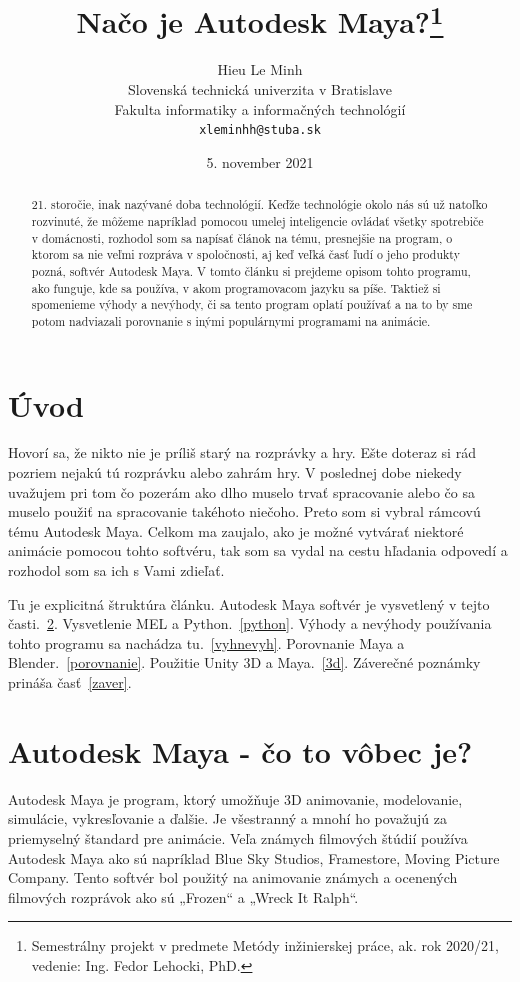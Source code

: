 \documentclass[10pt,oneside,slovak,a4paper]{article}
\title{Načo je Autodesk Maya?\thanks{Semestrálny projekt v predmete Metódy inžinierskej práce, ak. rok 2020/21, vedenie: Ing. Fedor Lehocki, PhD.}}
\author{Hieu Le Minh\\[2pt]
	{\small Slovenská technická univerzita v Bratislave}\\
	{\small Fakulta informatiky a informačných technológií}\\
	{\small \texttt{xleminhh@stuba.sk}}
	}
\date{\small 5. november 2021}
\begin{document}
\maketitle

\begin{abstract}
21. storočie, inak nazývané doba technológií. Keďže technológie okolo nás sú už natoľko rozvinuté, že môžeme napríklad pomocou umelej inteligencie ovládať všetky spotrebiče v domácnosti,
rozhodol som sa napísať článok na tému, presnejšie na program, o ktorom sa nie veľmi rozpráva v spoločnosti, aj keď veľká časť ľudí o jeho produkty pozná, softvér Autodesk Maya.
V tomto článku si prejdeme opisom tohto programu, ako funguje, kde sa používa, v akom 
programovacom jazyku sa píše. Taktiež si spomenieme výhody a nevýhody, či 
sa tento program oplatí používať a na to by sme potom nadviazali porovnanie s inými populárnymi programami na animácie.
\end{abstract}



\section{Úvod}

Hovorí sa, že nikto nie je príliš starý na rozprávky a hry. Ešte doteraz si rád pozriem nejakú tú rozprávku alebo zahrám hry. V poslednej dobe niekedy uvažujem pri tom čo pozerám ako dlho muselo trvať spracovanie alebo čo sa muselo použiť na spracovanie takéhoto niečoho. Preto som si vybral rámcovú tému Autodesk Maya. Celkom ma zaujalo, ako je možné vytvárať niektoré animácie pomocou tohto softvéru, tak som sa vydal na cestu hľadania odpovedí a rozhodol som sa ich s Vami zdieľať.

Tu je explicitná štruktúra článku.
Autodesk Maya softvér je vysvetlený v tejto časti.~\ref{AM}.
Vysvetlenie MEL a Python.~\ref{python}.
Výhody a nevýhody používania tohto programu sa nachádza tu.~\ref{vyhnevyh}.
Porovnanie Maya a Blender.~\ref{porovnanie}.
Použitie Unity 3D a Maya.~\ref{3d}.
Záverečné poznámky prináša časť~\ref{zaver}.



\section{Autodesk Maya - čo to vôbec je?} \label{AM}

Autodesk Maya je program, ktorý umožňuje 3D animovanie, modelovanie, simulácie, vykresľovanie a ďalšie. Je všestranný a mnohí ho považujú za priemyselný štandard pre animácie. Veľa známych filmových štúdií používa Autodesk Maya ako sú napríklad Blue Sky Studios, Framestore, Moving Picture Company. Tento softvér bol použitý na animovanie známych a ocenených filmových rozprávok ako sú „Frozen“ a „Wreck It Ralph“.\\
\end{document}
